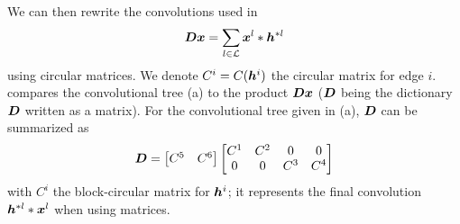 \noindent
We can then rewrite the convolutions used in
\begin{equation*}\bm{D}\bm{x} = \sum_{l \in \mathcal L} \bm{x}^l * \bm{h}^{*l}\end{equation*}
using circular matrices. We denote $C^i = C(\bm{h}^i)$ the circular matrix for edge $i$.  compares the convolutional tree (a) to the product $\bm{D}\bm{x}$ ($\bm{D}$ being the dictionary $\bm{D}$ written as a matrix). For the convolutional tree given in (a), $\bm{D}$ can be summarized as
\begin{align}
\bm{D} = \begin{bmatrix}C^5 & C^6\end{bmatrix} \begin{bmatrix}C^1 & C^2 & 0 & 0 \\0 & 0 & C^3 & C^4\end{bmatrix}\label{eq_matrix_developed}
\end{align}
with $C^i$ the block-circular matrix for $\bm{h}^i$; it represents the final convolution $\bm{h}^{*l}*\bm{x}^l$ when using matrices.

